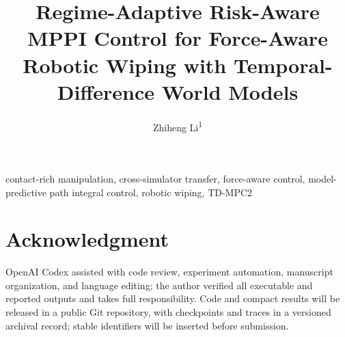 \documentclass{ieeetj}
\title{Regime-Adaptive Risk-Aware MPPI Control for Force-Aware Robotic Wiping with Temporal-Difference World Models}
\author{Zhiheng Li\textsuperscript{1}}
\affil{Independent Researcher, Shanghai, China}
\begin{document}



\begin{IEEEkeywords}
contact-rich manipulation, cross-simulator transfer, force-aware control,
model-predictive path integral control, robotic wiping, TD-MPC2
\end{IEEEkeywords}
\maketitle
\pagestyle{submission}
\thispagestyle{submission}













\section*{Acknowledgment}
OpenAI Codex assisted with code review, experiment automation, manuscript
organization, and language editing; the author verified all executable and
reported outputs and takes full responsibility. Code and compact results will
be released in a public Git repository, with checkpoints and traces in a
versioned archival record; stable identifiers will be inserted before
submission.



\end{document}
